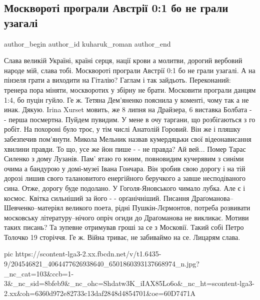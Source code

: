  
 
 
 
 
 
\subsection{Москвороті програли Австрії 0:1 бо не грали узагалі}
\label{sec:22_06_2021.fb.kuharuk_roman.1.moskvoroti_avstria}
\ifcmt
 author_begin
   author_id kuharuk_roman
 author_end
\fi

Слава великій Україні, країні серця, нації крови а молитви, дорогий вербовий
народе мій, слава тобі. Москвороті програли Австрії 0:1 бо не грали узагалі. А
на пінзеля грати а виходити на Гіталію? Гаглам і так зайдьоть. Переконаний:
тренера пора міняти, москворотих у збірну не брати. Московити програли данцям
1:4, бо пуцін гуйло. Ге ж. Тетяна Дем'яненко пояснила у коменті, чому так а не
инак. Дякую. Irina Xurset мовить, же 8 липня на Драйзера, 6 виставка Болбата -
- перша посмертна. Пуйдем пувидим. У мене в очу таргани, що розбігаються з го
робіт. На похороні було троє, у тім числі Анатолій Горовий. Він же і пляшку
забезпечив пом'янути. Микола Мельник назвав кумердяцьки свої відеонависання
хвилини правди. То що, усе же йон пише - - не правда? Ай вей... Помер Тарас
Силенко з дому Лузанів. Пам' ятаю го юним, повновидим кучерявим з синіми очима
а бандурою у домі-музеї Івана Гончара. Він зробив свою дорогу і на тій дорозі
лишив свого талановитого енергійного беручкого а завше несподіваного сина.
Отже, дорогу буде подолано. У Гоголя-Яновського чимало лубка. Але є і космос.
Квітка сильніший за його - - орґанічніший. Писання
Драґоманова--Шевченко--матеріял великого поета, рідні Пушкін-Лєрмонтов, потреба
розвивати московську літературу--нічого опріч огиди до Драґоманова не викликає.
Мотиви таких писань? Та зупевне отримував гроші за се з Московії. Такий собі
Петро Толочко 19 сторіччя. Ге ж. Війна триває, не забиваймо на се. Лицарям
слава.

\ifcmt
  pic https://scontent-lga3-2.xx.fbcdn.net/v/t1.6435-9/204546821_4064477626938640_6501860393137668974_n.jpg?_nc_cat=103&ccb=1-3&_nc_sid=8bfeb9&_nc_ohc=Shdatw3K_iIAX85Lo6o&_nc_ht=scontent-lga3-2.xx&oh=6360d972e82733c13daf2848d4854701&oe=60D7471A
\fi
